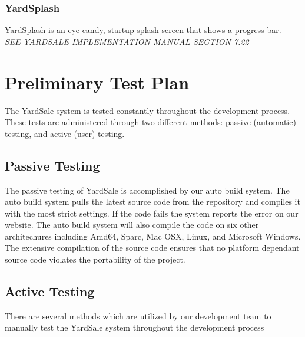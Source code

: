 \documentclass{report}
\begin{document}
        \subsection{YardSplash}
        YardSplash is an eye-candy, startup splash screen that shows a
        progress bar.\\
        {\sl SEE YARDSALE IMPLEMENTATION MANUAL SECTION 7.22}

\chapter{Preliminary Test Plan}
The YardSale system is tested constantly throughout the
development process.  These tests are administered through two
different methods: passive (automatic) testing, and active (user)
testing.

    \section{Passive Testing}

    The passive testing of YardSale is accomplished by our auto build system.  The auto build system pulls the latest source
    code from the repository and compiles it with the most strict settings.  If the code fails the system reports the error
    on our website.  The auto build system will also compile the code on six other architechures including Amd64, Sparc, Mac OSX,
    Linux, and Microsoft Windows.  The extensive compilation of the source code ensures that no platform dependant source code
    violates the portability of the project.

    \section{Active Testing}
    There are several methods which are utilized by our
    development team to manually test the YardSale system
    throughout the development process
\end{document}
